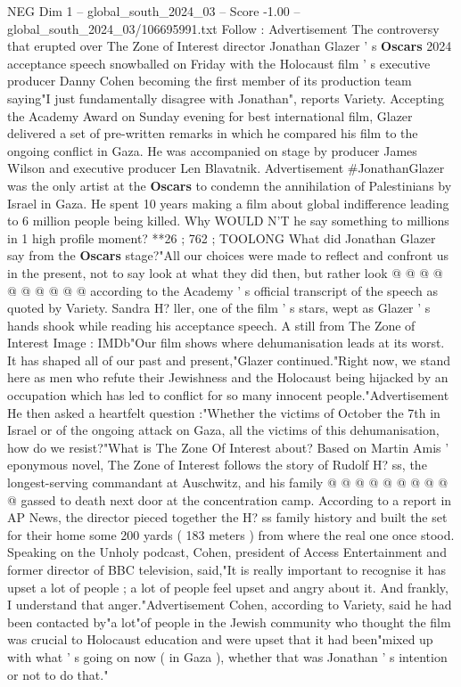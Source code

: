 \begin{textsample}{NEG Dim 1 – global\_south\_2024\_03 – Score -1.00 – global\_south\_2024\_03/106695991.txt}  \label{ex:f1_neg_108}
Follow : Advertisement The controversy that erupted over The Zone of Interest director Jonathan Glazer ' s \textbf{Oscars} 2024 acceptance speech snowballed on Friday with the Holocaust film ' s executive producer Danny Cohen becoming the first member of its production team saying"I just fundamentally disagree with Jonathan", reports Variety.
Accepting the Academy Award on Sunday evening for best international film, Glazer delivered a set of pre-written remarks in which he compared his film to the ongoing conflict in Gaza.
He was accompanied on stage by producer James Wilson and executive producer Len Blavatnik.
Advertisement \#JonathanGlazer was the only artist at the \textbf{Oscars} to condemn the annihilation of Palestinians by Israel in Gaza.
He spent 10 years making a film about global indifference leading to 6 million people being killed.
Why WOULD N'T he say something to millions in 1 high profile moment? **26 ; 762 ; TOOLONG What did Jonathan Glazer say from the \textbf{Oscars} stage?"All our choices were made to reflect and confront us in the present, not to say look at what they did then, but rather look @ @ @ @ @ @ @ @ @ @ according to the Academy ' s official transcript of the speech as quoted by Variety.
Sandra H? ller, one of the film ' s stars, wept as Glazer ' s hands shook while reading his acceptance speech.
A still from The Zone of Interest Image : IMDb"Our film shows where dehumanisation leads at its worst.
It has shaped all of our past and present,"Glazer continued."Right now, we stand here as men who refute their Jewishness and the Holocaust being hijacked by an occupation which has led to conflict for so many innocent people."Advertisement He then asked a heartfelt question :"Whether the victims of October the 7th in Israel or of the ongoing attack on Gaza, all the victims of this dehumanisation, how do we resist?"What is The Zone Of Interest about?
Based on Martin Amis ' eponymous novel, The Zone of Interest follows the story of Rudolf H? ss, the longest-serving commandant at Auschwitz, and his family @ @ @ @ @ @ @ @ @ @ gassed to death next door at the concentration camp.
According to a report in AP News, the director pieced together the H? ss family history and built the set for their home some 200 yards ( 183 meters ) from where the real one once stood.
Speaking on the Unholy podcast, Cohen, president of Access Entertainment and former director of BBC television, said,"It is really important to recognise it has upset a lot of people ; a lot of people feel upset and angry about it.
And frankly, I understand that anger."Advertisement Cohen, according to Variety, said he had been contacted by"a lot"of people in the Jewish community who thought the film was crucial to Holocaust education and were upset that it had been"mixed up with what ' s going on now ( in Gaza ), whether that was Jonathan ' s intention or not to do that."

\end{textsample}
